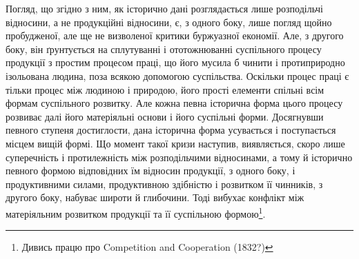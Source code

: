 Погляд, що згідно з ним, як історично дані розглядається лише розподільчі
відносини, а не продукційні відносини, є, з одного боку, лише погляд щойно пробудженої,
але ще не визволеної критики буржуазної економії. Але, з другого боку,
він ґрунтується на сплутуванні і ототожнюванні суспільного процесу продукції з
простим процесом праці, що його мусила б чинити і протиприродно ізольована
людина, поза всякою допомогою суспільства. Оскільки процес праці є тільки процес
між людиною і природою, його прості елементи спільні всім формам суспільного
розвитку. Але кожна певна історична форма цього процесу розвиває далі його матеріяльні
основи і його суспільні форми. Досягнувши певного ступеня достиглости,
дана історична форма усувається і поступається місцем вищій формі. Що момент
такої кризи наступив, виявляється, скоро лише суперечність і протилежність між
розподільчими відносинами, а тому й історично певного формою відповідних їм відносин
продукції, з одного боку, і продуктивними силами, продуктивною здібністю
і розвитком її чинників, з другого боку, набуває широти й глибочини. Тоді вибухає
конфлікт між матеріяльним розвитком продукції та її суспільною формою\footnote{
Дивись працю про Competition and Cooperation (1832?)
}.